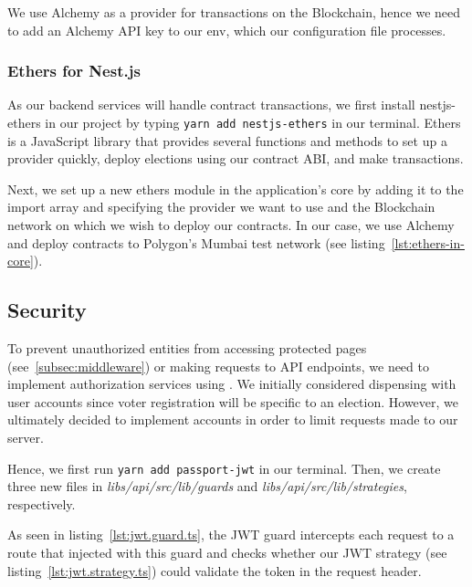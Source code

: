 We use Alchemy as a provider for transactions on the \gls{Blockchain}, hence we need to add an Alchemy \gls{API} key to our env, which our configuration file processes.

\subsubsection{Ethers for Nest.js}

As our backend services will handle contract transactions, we first install nestjs-ethers in our project by typing \texttt{yarn add nestjs-ethers} in our terminal.
Ethers is a JavaScript library that provides several functions and methods to set up a provider quickly, deploy elections using our contract \gls{ABI}, and make transactions.

Next, we set up a new ethers module in the application's core by adding it to the import array and specifying the provider we want to use and the \gls{Blockchain} network on which we wish to deploy our contracts.
In our case, we use Alchemy and deploy contracts to Polygon’s Mumbai test network (see listing~\ref{lst:ethers-in-core}).


\subsection{Security}\label{subsec:security}

To prevent unauthorized entities from accessing protected pages (see~\ref{subsec:middleware}) or making requests to \gls{API} endpoints, we need to implement authorization services using .
We initially considered dispensing with user accounts since voter registration will be specific to an election.
However, we ultimately decided to implement accounts in order to limit requests made to our server.

Hence, we first run \texttt{yarn add passport-jwt} in our terminal.
Then, we create three new files in \emph{libs/api/src/lib/guards} and \emph{libs/api/src/lib/strategies}, respectively.

As seen in listing~\ref{lst:jwt.guard.ts}, the \gls{JWT} guard intercepts each request to a route that injected with this guard and checks whether our \gls{JWT} strategy (see listing~\ref{lst:jwt.strategy.ts}) could validate the token in the request header.

